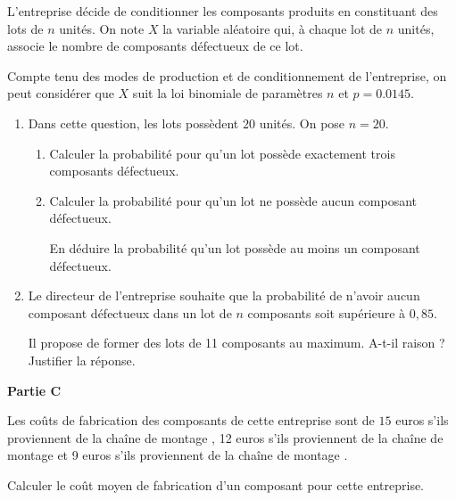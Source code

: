\medskip

L'entreprise décide de conditionner les composants produits en constituant des lots de $n$ unités. On note $X$ la variable aléatoire qui, à chaque lot de $n$ unités, associe le nombre de composants défectueux de ce lot.

Compte tenu des modes de production et de conditionnement de l'entreprise, on peut considérer que $X$ suit la loi binomiale de paramètres $n$ et $p = \num{0,0145}$.

\begin{enumerate}
	\item Dans cette question, les lots possèdent $20$ unités. On pose $n =20$.
	\begin{enumerate}
		\item Calculer la probabilité pour qu'un lot possède exactement trois composants défectueux.
		\item Calculer la probabilité pour qu'un lot ne possède aucun composant défectueux.
		
		En déduire la probabilité qu'un lot possède au moins un composant défectueux.
	\end{enumerate}
	\item  Le directeur de l'entreprise souhaite que la probabilité de n'avoir aucun composant
	défectueux dans un lot de $n$ composants soit supérieure à $0,85$. 
	
	Il propose de former des lots de 11 composants au maximum. A-t-il raison ? Justifier la réponse.
\end{enumerate}

\textbf{Partie C}

\medskip

Les coûts de fabrication des composants de cette entreprise sont de $15$ euros s'ils proviennent de la chaîne de montage , 12 euros s'ils proviennent de la chaîne de montage  et 9 euros s'ils proviennent de la chaîne de montage .

Calculer le coût moyen de fabrication d'un composant pour cette entreprise.

